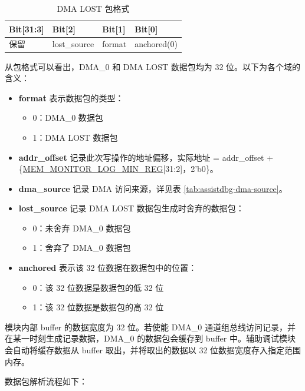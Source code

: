 \documentclass[main\_\_CN.tex]{subfiles}
\begin{document}
\begin{longtable}[c]{|L{2cm}|L{2cm}|L{2cm}|L{2cm}|}
    \caption{DMA LOST 包格式}\label{tab:dbgassist-dma-lost-package}
    \\\hline
    \textbf{Bit[31:3]} & \textbf{Bit[2]} & \textbf{Bit[1]} & \textbf{Bit[0]} \\\hline
    保留 & lost\_source & format & anchored(0) \\\hline
\end{longtable}

从包格式可以看出，DMA\_0 和 DMA LOST 数据包均为 32 位。以下为各个域的含义：

\begin{itemize}
    \item \textbf{format} 表示数据包的类型：
    \begin{itemize}
        \item 0：DMA\_0 数据包
        \item 1：DMA LOST 数据包
    \end{itemize}
    \item \textbf{addr\_offset} 记录此次写操作的地址偏移，实际地址 = addr\_offset + \{\hyperref[regdesc:MEMMONITORLOGMINREG]{MEM\_MONITOR\_LOG\_MIN\_REG}[31:2]，2'b0\}。
    \item \textbf{dma\_source} 记录 DMA 访问来源，详见表 \ref{tab:assistdbg-dma-source}。
    \item \textbf{lost\_source} 记录 DMA LOST 数据包生成时舍弃的数据包：
    \begin{itemize}
        \item 0：未舍弃 DMA\_0 数据包
        \item 1：舍弃了 DMA\_0 数据包
    \end{itemize}
    \item \textbf{anchored} 表示该 32 位数据在数据包中的位置：
    \begin{itemize}
        \item 0：该 32 位数据是数据包的低 32 位
        \item 1：该 32 位数据是数据包的高 32 位
    \end{itemize}
\end{itemize}

模块内部 buffer 的数据宽度为 32 位。若使能 DMA\_0 通道组总线访问记录，并在某一时刻生成记录数据，DMA\_0 的数据包会缓存到 buffer 中。辅助调试模块会自动将缓存数据从 buffer 取出，并将取出的数据以 32 位数据宽度存入指定范围内存。

数据包解析流程如下：
\end{document}
